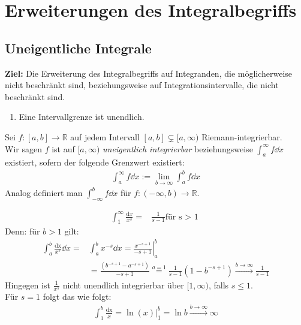 \section{Erweiterungen des Integralbegriffs}

\subsection{Uneigentliche Integrale}

\textbf{Ziel:} Die Erweiterung des Integralbegriffs auf Integranden, die 
möglicherweise nicht beschränkt sind, beziehungsweise auf Integrationsintervalle, 
die nicht beschränkt sind.

\begin{enumerate}
	\item Eine Intervallgrenze ist unendlich.
\end{enumerate}

\begin{Definition}{
	Sei $f : [a,b] \rightarrow \mathbb{R}$ auf jedem Intervall $[a,b] \subsetneq
	[a, \infty)$ Riemann-integrierbar. \\
	Wir sagen $f$ ist auf $[a, \infty)$ \emph{uneigentlich integrierbar} 
	beziehungsweise $\int_a^{\infty} f \dd{x}$ existiert, sofern der 
	folgende Grenzwert existiert:
	\begin{align*}
		\int_a^{\infty} f \dd{x} := \lim\limits_{b \rightarrow \infty}
			{\int_a^b f \dd{x}}
	\end{align*}
	Analog definiert man $\int_{-\infty}^b f \dd{x}$ für $f: (-\infty, b)
	 \rightarrow \mathbb{R}$.
}\end{Definition}

\begin{Beispiel}{
	\begin{align*}
		\int_1^{\infty} \frac{\mathrm{d}x}{x^s} = & \frac{1}{s-1} \text{für s > 1 }
	\end{align*}
	Denn: für $b > 1$ gilt:
	\begin{align*}
		\int_a^b \frac{\mathrm{dx}}{x^s} \dd{x} = & \int_a^b x^{-s} \dd{x}
		  = \left.\frac{x^{-s+1}}{-s+1} \right\vert_a^b \\
		  & = \frac{\left( b^{-s+1} - a^{-s+1}\right)}{-s+1} \overset{a = 1}{=}
		  \frac{1}{s-1}\left(1-b^{-s+1}\right) 
		  \overset{b \rightarrow \infty}{\longrightarrow}
		  \frac{1}{s-1}
	\end{align*}
	Hingegen ist $\frac{1}{x^s}$ nicht unendlich integrierbar über $[1, \infty)$,
	falls $s \leq 1$.\\
	Für $s=1$ folgt das wie folgt:
	\begin{align*}
		\int_1^b \frac{\mathrm{dx}}{x} = \left. \ln(x) \right\vert_1^b 
		= \ln b \overset{b \rightarrow \infty}{\longrightarrow} \infty
	\end{align*}
}\end{Beispiel}

